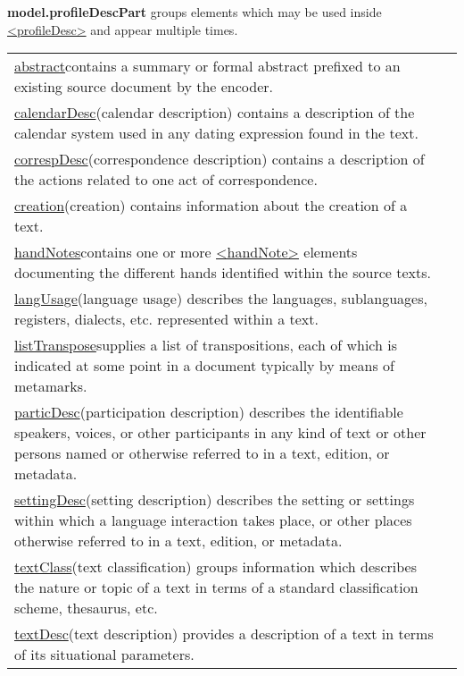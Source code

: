 \begin{sansreflist}
\item [\textbf{model.profileDescPart}] groups elements which may be used inside \hyperref[TEI.profileDesc]{<profileDesc>} and appear multiple times. \par 
\begin{longtable}{P{0.19574285714285714\textwidth}P{0.6542571428571428\textwidth}}
\hyperref[TEI.abstract]{abstract}\tabcellsep contains a summary or formal abstract prefixed to an existing source document by the encoder.\\
\hyperref[TEI.calendarDesc]{calendarDesc}\tabcellsep (calendar description) contains a description of the calendar system used in any dating expression found in the text.\\
\hyperref[TEI.correspDesc]{correspDesc}\tabcellsep (correspondence description) contains a description of the actions related to one act of correspondence.\\
\hyperref[TEI.creation]{creation}\tabcellsep (creation) contains information about the creation of a text.\\
\hyperref[TEI.handNotes]{handNotes}\tabcellsep contains one or more \hyperref[TEI.handNote]{<handNote>} elements documenting the different hands identified within the source texts.\\
\hyperref[TEI.langUsage]{langUsage}\tabcellsep (language usage) describes the languages, sublanguages, registers, dialects, etc. represented within a text.\\
\hyperref[TEI.listTranspose]{listTranspose}\tabcellsep supplies a list of transpositions, each of which is indicated at some point in a document typically by means of metamarks.\\
\hyperref[TEI.particDesc]{particDesc}\tabcellsep (participation description) describes the identifiable speakers, voices, or other participants in any kind of text or other persons named or otherwise referred to in a text, edition, or metadata.\\
\hyperref[TEI.settingDesc]{settingDesc}\tabcellsep (setting description) describes the setting or settings within which a language interaction takes place, or other places otherwise referred to in a text, edition, or metadata.\\
\hyperref[TEI.textClass]{textClass}\tabcellsep (text classification) groups information which describes the nature or topic of a text in terms of a standard classification scheme, thesaurus, etc.\\
\hyperref[TEI.textDesc]{textDesc}\tabcellsep (text description) provides a description of a text in terms of its situational parameters.\end{longtable} \par
 

\end{sansreflist}
